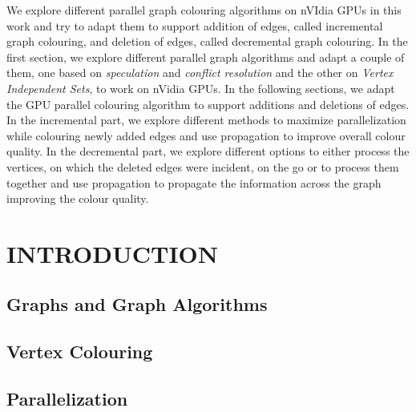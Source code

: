 \documentclass[MTech]{iitmdiss}
\begin{document}
We explore different parallel graph colouring algorithms on nVIdia GPUs in this work and try to adapt them to support addition of edges, called incremental graph colouring, and deletion of edges, called decremental graph colouring. In the first section, we explore different parallel graph algorithms and adapt a couple of them, one based on \textit{speculation} and \textit{conflict resolution} and the other on \textit{Vertex Independent Sets}, to work on nVidia GPUs. In the following sections, we adapt the GPU parallel colouring algorithm to support additions and deletions of edges. In the incremental part, we explore different methods to maximize parallelization while colouring newly added edges and use propagation to improve overall colour quality. In the decremental part, we explore different options to either process the vertices, on which the deleted edges were incident, on the go or to process them together and use propagation to propagate the information across the graph improving the colour quality.   

\pagebreak


\begin{singlespace}
\tableofcontents
\thispagestyle{empty}

\listoftables
{}
\listoffigures
{}
\end{singlespace}

\pagebreak



%
%
\chapter{INTRODUCTION}
\label{chap:intro}
\section{Graphs and Graph Algorithms}
\section{Vertex Colouring}
\section{Parallelization}
\end{document}
